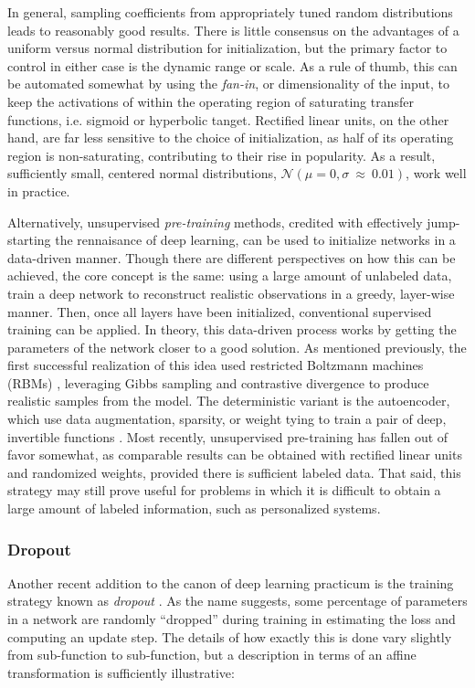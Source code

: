 In general, sampling coefficients from appropriately tuned random distributions leads to reasonably good results.
There is little consensus on the advantages of a uniform versus normal distribution for initialization, but the primary factor to control in either case is the dynamic range or scale.
As a rule of thumb, this can be automated somewhat by using the \emph{fan-in}, or dimensionality of the input, to keep the activations of within the operating region of saturating transfer functions, i.e. sigmoid or hyperbolic tanget.
Rectified linear units, on the other hand, are far less sensitive to the choice of initialization, as half of its operating region is non-saturating, contributing to their rise in popularity.
As a result, sufficiently small, centered normal distributions, $\mathcal{N}(\mu=0, \sigma~\approx~0.01)$, work well in practice.

Alternatively, unsupervised \emph{pre-training} methods, credited with effectively jump-starting the rennaisance of deep learning, can be used to initialize networks in a data-driven manner.
Though there are different perspectives on how this can be achieved, the core concept is the same:
using a large amount of unlabeled data, train a deep network to reconstruct realistic observations in a greedy, layer-wise manner.
Then, once all layers have been initialized, conventional supervised training can be applied.
In theory, this data-driven process works by getting the parameters of the network closer to a good solution.
As mentioned previously, the first successful realization of this idea used restricted Boltzmann machines (RBMs) \cite{Hinton2006Fast}, leveraging Gibbs sampling and contrastive divergence to produce realistic samples from the model.
The deterministic variant is the autoencoder, which use data augmentation, sparsity, or weight tying to train a pair of deep, invertible functions \cite{Bengio2013Representation}.
Most recently, unsupervised pre-training has fallen out of favor somewhat, as comparable results can be obtained with rectified linear units and randomized weights, provided there is sufficient labeled data.
That said, this strategy may still prove useful for problems in which it is difficult to obtain a large amount of labeled information, such as personalized systems.


\subsubsection{Dropout}

Another recent addition to the canon of deep learning practicum is the training strategy known as \emph{dropout} \cite{Hinton2012Improving}.
As the name suggests, some percentage of parameters in a network are randomly ``dropped'' during training in estimating the loss and computing an update step.
The details of how exactly this is done vary slightly from sub-function to sub-function, but a description in terms of an affine transformation is sufficiently illustrative:

